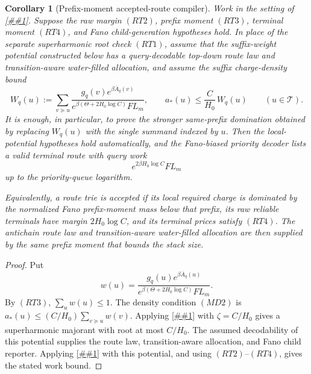\documentclass[10pt]{article}
\newcommand{\cref}[1]{\ref{##1}}
\newtheorem{corollary}[theorem]{Corollary}
\theoremstyle{definition}
\begin{document}
\begin{corollary}[Prefix-moment accepted-route compiler]
   \label{cor:prefix-moment-accepted-route-compiler}
   Work in the setting of
   \cref{cor:finite-accepted-route-trie-compiler}.  Suppose the raw margin
   \((RT2)\), prefix moment \((RT3)\), terminal moment \((RT4)\), and
   Fano child-generation hypotheses hold.  In place of the separate
   superharmonic root check \((RT1)\), assume that the suffix-weight potential
   constructed below has a query-decodable top-down route law and
   transition-aware water-filled allocation, and assume the suffix
   charge-density bound
   \[
      W_q(u):=
      \sum_{v\succeq u}
      \frac{
         g_q(v)e^{\beta\overline A_q(v)}
      }{
         e^{\beta(\Theta+2H_0\log C)}F L_m
      },
      \qquad
      a_*(u)
      \le
      \frac{C}{H_0}\,W_q(u)
      \qquad(u\in\mathcal T).
      \tag{MD2}
   \]
   It is enough, in particular, to prove the stronger same-prefix domination
   obtained by replacing \(W_q(u)\) with the single summand indexed by \(u\).
   Then the local-potential hypotheses hold automatically, and the Fano-biased
   priority decoder lists a valid terminal route with query work
   \[
      e^{2\beta H_0\log C}F L_m
   \]
   up to the priority-queue logarithm.

   Equivalently, a route trie is accepted if its local required charge is
   dominated by the normalized Fano prefix-moment mass below that prefix, its
   raw reliable terminals have margin \(2H_0\log C\), and its terminal prices
   satisfy \((RT4)\).  The antichain route law and transition-aware
   water-filled allocation are then supplied by the same prefix moment that
   bounds the stack size.
\end{corollary}

\begin{proof}
   Put
   \[
      w(u)=
      \frac{
         g_q(u)e^{\beta\overline A_q(u)}
      }{
         e^{\beta(\Theta+2H_0\log C)}F L_m
      } .
   \]
   By \((RT3)\), \(\sum_uw(u)\le1\).  The density condition \((MD2)\) is
   \(a_*(u)\le(C/H_0)\sum_{v\succeq u}w(v)\).  Applying
   \cref{lem:moment-dominated-superharmonic} with
   \(\zeta=C/H_0\) gives a superharmonic majorant with root at most \(C/H_0\).
   The assumed decodability of this potential supplies the route law,
   transition-aware allocation, and Fano child reporter.  Applying
   \cref{cor:local-potential-antichain-fano} with this potential, and using
   \((RT2)\)--\((RT4)\), gives the stated work bound.
\end{proof}
\end{document}

